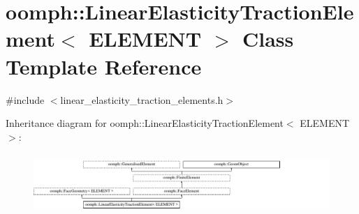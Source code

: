 \hypertarget{classoomph_1_1LinearElasticityTractionElement}{}\section{oomph\+:\+:Linear\+Elasticity\+Traction\+Element$<$ E\+L\+E\+M\+E\+NT $>$ Class Template Reference}
\label{classoomph_1_1LinearElasticityTractionElement}


{\ttfamily \#include $<$linear\+\_\+elasticity\+\_\+traction\+\_\+elements.\+h$>$}

Inheritance diagram for oomph\+:\+:Linear\+Elasticity\+Traction\+Element$<$ E\+L\+E\+M\+E\+NT $>$\+:\begin{figure}[H]
\begin{center}
\leavevmode
\includegraphics[height=2.326064cm]{classoomph_1_1LinearElasticityTractionElement}
\end{center}
\end{figure}
